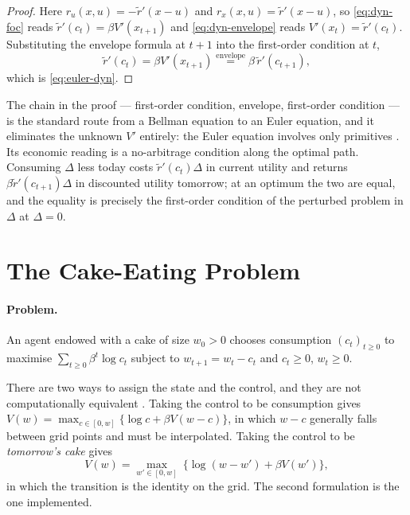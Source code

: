 \begin{proof}
	Here $r_u(x,u)=-\tilde r'(x-u)$ and $r_x(x,u)=\tilde r'(x-u)$, so
	\eqref{eq:dyn-foc} reads $\tilde r'(c_t)=\beta V'(x_{t+1})$ and
	\eqref{eq:dyn-envelope} reads $V'(x_t)=\tilde r'(c_t)$. Substituting the
	envelope formula at $t+1$ into the first-order condition at $t$,
	\[
		\tilde r'(c_t)=\beta V'(x_{t+1})
		\overset{\text{envelope}}{=}\beta\,\tilde r'(c_{t+1}),
	\]
	which is \eqref{eq:euler-dyn}.
\end{proof}

The chain in the proof --- first-order condition, envelope, first-order condition
--- is the standard route from a Bellman equation to an Euler equation, and it
eliminates the unknown $V'$ entirely: the Euler equation involves only
primitives \autocite[slide 32]{fukuda2026dynamic}. Its economic reading is a
no-arbitrage condition along the optimal path. Consuming $\Delta$ less today
costs $\tilde r'(c_t)\Delta$ in current utility and returns
$\beta\tilde r'(c_{t+1})\Delta$ in discounted utility tomorrow; at an optimum the
two are equal, and the equality is precisely the first-order condition of the
perturbed problem in $\Delta$ at $\Delta=0$.

\section{The Cake-Eating Problem}\label{sec:dyn-cake}

\paragraph{Problem.} An agent endowed with a cake of size $w_0>0$ chooses
consumption $(c_t)_{t\geq0}$ to maximise $\sum_{t\geq0}\beta^{t}\log c_t$ subject
to $w_{t+1}=w_t-c_t$ and $c_t\geq0$, $w_t\geq0$.

There are two ways to assign the state and the control, and they are not
computationally equivalent \autocite[slides 21--22]{fukuda2026dynamic}. Taking
the control to be consumption gives
$V(w)=\max_{c\in[0,w]}\{\log c+\beta V(w-c)\}$, in which $w-c$ generally falls
between grid points and must be interpolated. Taking the control to be
\emph{tomorrow's cake} gives
\begin{equation}\label{eq:cake-bellman}
	V(w)=\max_{w'\in[0,w]}\ \bigl\{\log(w-w')+\beta V(w')\bigr\},
\end{equation}
in which the transition is the identity on the grid. The second formulation is
the one implemented.

